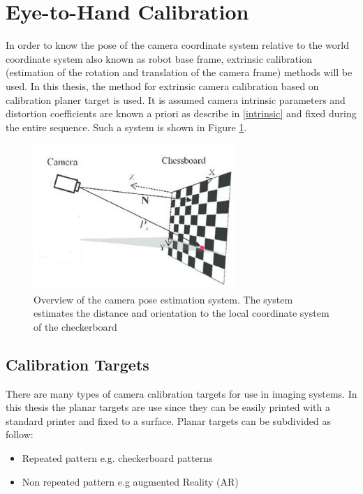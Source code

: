 \section{Eye-to-Hand Calibration}

In order to know the pose of the camera coordinate system relative to the world coordinate system also known as robot base frame, extrinsic calibration (estimation of the rotation and translation of the camera frame) methods will be used. In this thesis, the method for extrinsic camera calibration based on calibration planer target is used. It is assumed camera intrinsic parameters and distortion coefficients are known a priori as describe in \ref{intrinsic} and fixed during the entire sequence. Such a system is shown in Figure \ref{fig:camposest}.


\begin{figure}[!h]
\begin{center}
\includegraphics[width=3in]{figures03/camposest.png}
\caption{Overview of the camera pose estimation system. The system estimates the distance
and orientation to the local coordinate system of the checkerboard}%
\label{fig:camposest}
\end{center}
\end{figure}

\subsection{Calibration Targets}\label{caltar}
There are many types of camera calibration targets for use in imaging systems. In this thesis the planar targets are use since they can be easily printed with a standard
printer and fixed to a surface. Planar targets can be subdivided as follow:
\begin{itemize}
\item Repeated pattern e.g. checkerboard patterns 
\item Non repeated pattern e.g augmented Reality (AR)
\end{itemize}

